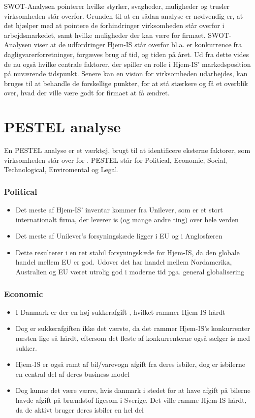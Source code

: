 SWOT-Analysen \cite{Organisation} pointerer hvilke styrker, svagheder, muligheder og trusler virksomheden står overfor. Grunden til at en sådan analyse er nødvendig er, at det hjælper med at pointere de forhindringer virksomheden står overfor i arbejdsmarkedet, samt hvilke muligheder der kan være for firmaet. SWOT-Analysen viser at de udfordringer Hjem-IS står overfor bl.a. er konkurrence fra dagligvarerforretninger, forgæves brug af tid, og tiden på året. Ud fra dette vides de nu også hvilke centrale faktorer, der spiller en rolle i Hjem-IS' markedsposition på nuværende tidspunkt.
Senere kan en vision for virksomheden udarbejdes, kan bruges til at behandle de forskellige punkter, for at stå stærkere og få et overblik over, hvad der ville være godt for firmaet at få ændret.

\section{PESTEL analyse}
En PESTEL analyse er et værktøj, brugt til at identificere eksterne faktorer, som virksomheden står over for \cite{Oxford}. PESTEL står for Political, Economic, Social, Technological, Enviromental og Legal. 
\subsubsection{Political}
\begin{itemize}
    \item Det meste af Hjem-IS’ inventar kommer fra Unilever, som er et stort internationalt firma, der leverer is (og mange andre ting) over hele verden
    \item Det meste af Unilever’s forsyningskæde ligger i EU og i Anglosfæren
    \item Dette resulterer i en ret stabil forsyningskæde for Hjem-IS, da den globale handel mellem EU er god. Udover det har handel mellem Nordamerika, Australien og EU været utrolig god i moderne tid pga. general globalisering
\end{itemize}
\subsubsection{Economic}
\begin{itemize}
    \item I Danmark er der en høj sukkerafgift \cite{Sugar}, hvilket rammer Hjem-IS hårdt
    \item Dog er sukkerafgiften ikke det værste, da det rammer Hjem-IS’s konkurrenter næsten lige så hårdt, eftersom det fleste af konkurrenterne også sælger is med sukker.
    \item Hjem-IS er også ramt af bil/varevogn afgift fra deres isbiler, dog er isbilerne en central del af deres business model
    \item Dog kunne det være værre, hvis danmark i stedet for at have afgift på bilerne havde afgift på brændstof ligesom i Sverige. Det ville ramme Hjem-IS hårdt, da de aktivt bruger deres isbiler en hel del
\end{itemize}
